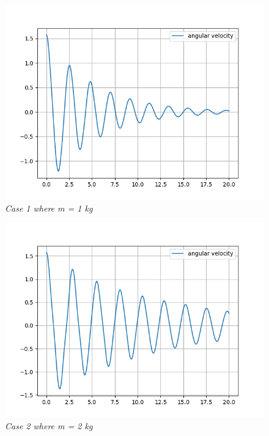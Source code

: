         \begin{figure}[H]
            \centering
            \includegraphics{Appendix/RSimPictures/A/am1.png}
            \caption{\textit{Case 1 where m = 1 kg}}
            \label{}
        \end{figure}
            
        \begin{figure}[H]
            \centering
            \includegraphics{Appendix/RSimPictures/A/am2.png}
            \caption{\textit{Case 2 where m = 2 kg}}
            \label{}
        \end{figure}
            

